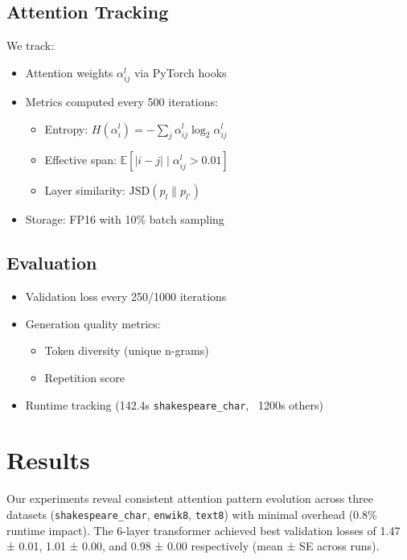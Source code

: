 \documentclass{article} %
\begin{document}
\subsection{Attention Tracking}
We track:
\begin{itemize}
    \item Attention weights $\alpha_{ij}^l$ via PyTorch hooks
    \item Metrics computed every 500 iterations:
    \begin{itemize}
        \item Entropy: $H(\alpha_i^l) = -\sum_j \alpha_{ij}^l \log_2 \alpha_{ij}^l$
        \item Effective span: $\mathbb{E}[|i-j| \mid \alpha_{ij}^l > 0.01]$
        \item Layer similarity: $\text{JSD}(p_l \| p_{l'})$
    \end{itemize}
    \item Storage: FP16 with 10\% batch sampling
\end{itemize}

\subsection{Evaluation}
\begin{itemize}
    \item Validation loss every 250/1000 iterations
    \item Generation quality metrics:
    \begin{itemize}
        \item Token diversity (unique n-grams)
        \item Repetition score
    \end{itemize}
    \item Runtime tracking (142.4s \texttt{shakespeare\_char}, ~1200s others)
\end{itemize}

\section{Results}
\label{sec:results}

Our experiments reveal consistent attention pattern evolution across three datasets (\texttt{shakespeare\_char}, \texttt{enwik8}, \texttt{text8}) with minimal overhead (0.8\% runtime impact). The 6-layer transformer achieved best validation losses of 1.47 ± 0.01, 1.01 ± 0.00, and 0.98 ± 0.00 respectively (mean ± SE across runs).
\end{document}
